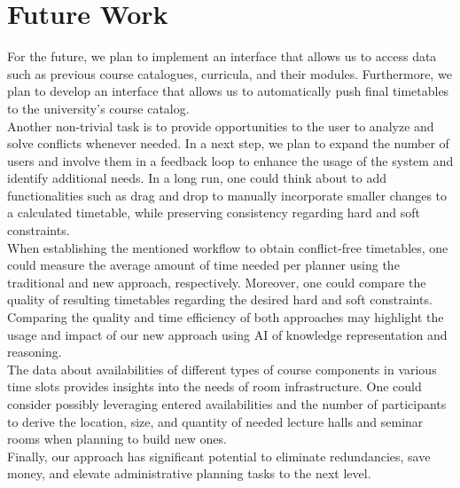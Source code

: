 \documentclass{easychair}
\begin{document}
\section{Future Work}
\label{sec:future}
  For the future, we plan to implement an interface that allows us to access data such as previous course catalogues, curricula, and their modules.
  Furthermore, we plan to develop an interface that allows us to automatically push final timetables to the university's course catalog. \\
  Another non-trivial task is to provide opportunities to the user to analyze and solve conflicts whenever needed.  
  In a next step, we plan to expand the number of users and involve them in a feedback loop to enhance the usage of the system and identify additional needs.
  In a long run, one could think about to add functionalities such as drag and drop to manually incorporate smaller changes to a calculated timetable, while preserving consistency regarding hard and soft constraints. \\
  When establishing the mentioned workflow to obtain conflict-free timetables, one could measure the average amount of time needed per planner using the traditional and new approach, respectively.
  Moreover, one could compare the quality of resulting timetables regarding the desired hard and soft constraints. 
  Comparing the quality and time efficiency of both approaches may highlight the usage and impact of our new approach using AI of knowledge representation and reasoning. \\
  The data about availabilities of different types of course components in various time slots provides insights into the needs of room infrastructure. 
  One could consider possibly leveraging entered availabilities and the number of participants to derive the location, size, and quantity of needed lecture halls and seminar rooms when planning to build new ones. \\
  Finally, our approach has significant potential to eliminate redundancies, save money, and elevate administrative planning tasks to the next level.


\label{sec:bib}

%
%
%



\end{document}
